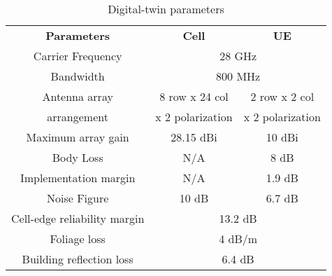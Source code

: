 \begin{table}[]
\begin{center}
\vspace{10pt}
\begin{tabular}{|c|c|c|}
\cline{1-3} 
\textbf{Parameters}        & \textbf{Cell}         & \textbf{UE}      \\ \cline{1-3} 
{Carrier Frequency}        &  \multicolumn{2}{|c|}{28 GHz}                \\ \cline{1-3}    
{Bandwidth}        &  \multicolumn{2}{|c|}{800 MHz}                \\ \cline{1-3}  
{Antenna array } & 8 row x 24 col  & 2 row x 2 col  \\
{arrangement} & x 2 polarization & x 2 polarization \\ \cline{1-3}
{Maximum array gain} & 28.15 dBi & 10 dBi \\   \cline{1-3}  
{Body Loss} & N/A & 8 dB \\  \cline{1-3}  
{Implementation margin} & N/A  & 1.9 dB  \\ \cline{1-3}  
{Noise Figure}  & 10 dB & 6.7 dB  \\ \cline{1-3}  
{Cell-edge reliability margin}  & \multicolumn{2}{|c|}{13.2 dB}                \\ \cline{1-3}  
{Foliage loss} &  \multicolumn{2}{|c|}{4 dB/m}                \\ \cline{1-3}  
{Building reflection loss} & \multicolumn{2}{|c|}{6.4 dB}                \\ \cline{1-3} 
\end{tabular}
\caption{Digital-twin parameters}
\label{tab:rf_parameters}
\end{center}
\vspace{-25pt}
\end{table}

